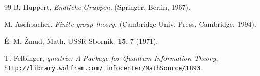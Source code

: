 \documentclass[aps,twocolumn,floatfix]{revtex4}
\begin{document}
\begin{thebibliography}{99}
		B. Huppert,
		{\it Endliche Gruppen.}
		(Springer, Berlin, 1967).

		M. Aschbacher, {\it Finite group theory.} (Cambridge Univ. Press,
		Cambridge, 1994).

		\'E. M. \v{Z}mud, Math. USSR Sbornik, {\bf 15}, 7 (1971).

		T. Felbinger,
		{\it qmatrix: A Package for Quantum Information Theory},
		{\tt http://library.wolfram.com/}{ }{\tt infocenter/MathSource/1893}.

\end{thebibliography}
\end{document}
